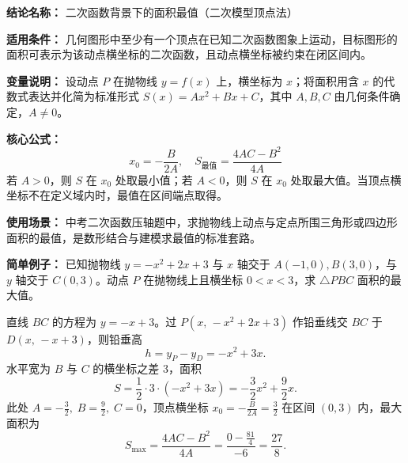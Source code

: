 \textbf{结论名称：} 二次函数背景下的面积最值（二次模型顶点法）

\textbf{适用条件：} 几何图形中至少有一个顶点在已知二次函数图象上运动，目标图形的面积可表示为该动点横坐标的二次函数，且动点横坐标被约束在闭区间内。

\textbf{变量说明：} 设动点 \(P\) 在抛物线 \(y = f(x)\) 上，横坐标为 \(x\)；将面积用含 \(x\) 的代数式表达并化简为标准形式 \(S(x) = Ax^{2} + Bx + C\)，其中 \(A, B, C\) 由几何条件确定，\(A \neq 0\)。

\textbf{核心公式：}
\[
\boxed{x_0 = -\frac{B}{2A}, \quad S_{\text{最值}} = \frac{4AC - B^{2}}{4A}}
\]
若 \(A > 0\)，则 \(S\) 在 \(x_0\) 处取最小值；若 \(A < 0\)，则 \(S\) 在 \(x_0\) 处取最大值。当顶点横坐标不在定义域内时，最值在区间端点取得。

\textbf{使用场景：} 中考二次函数压轴题中，求抛物线上动点与定点所围三角形或四边形面积的最值，是数形结合与建模求最值的标准套路。

\textbf{简单例子：}
已知抛物线 \(y = -x^{2}+2x+3\) 与 \(x\) 轴交于 \(A(-1,0), B(3,0)\)，与 \(y\) 轴交于 \(C(0,3)\)。动点 \(P\) 在抛物线上且横坐标 \(0<x<3\)，求 \(\triangle PBC\) 面积的最大值。

直线 \(BC\) 的方程为 \(y = -x+3\)。过 \(P(x,\,-x^{2}+2x+3)\) 作铅垂线交 \(BC\) 于 \(D(x,\,-x+3)\)，则铅垂高
\[
h = y_P - y_D = -x^{2}+3x .
\]
水平宽为 \(B\) 与 \(C\) 的横坐标之差 \(3\)，面积
\[
S = \frac{1}{2} \cdot 3 \cdot (-x^{2}+3x) = -\frac{3}{2}x^{2} + \frac{9}{2}x .
\]
此处 \(A=-\frac{3}{2},\; B=\frac{9}{2},\; C=0\)，顶点横坐标 \(x_0 = -\frac{B}{2A} = \frac{3}{2}\) 在区间 \((0,3)\) 内，最大面积为
\[
S_{\max} = \frac{4AC - B^{2}}{4A} = \frac{0 - \frac{81}{4}}{-6} = \frac{27}{8}.
\]